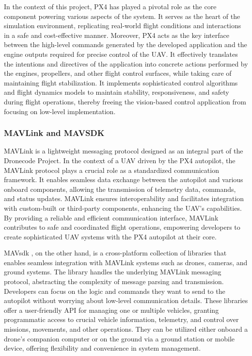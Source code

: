 In the context of this project, PX4 has played a pivotal role as the core component powering various aspects of the system. It serves as the heart of the simulation environment, replicating real-world flight conditions and interactions in a safe and cost-effective manner.
Moreover, PX4 acts as the key interface between the high-level commands generated by the developed application and the engine outputs required for precise control of the UAV. It effectively translates the intentions and directives of the application into concrete actions performed by the engines, propellers, and other flight control surfaces, while taking care of maintaining flight stabilization.
It implements sophisticated control algorithms and flight dynamics models to maintain stability, responsiveness, and safety during flight operations, thereby freeing the vision-based control application from focusing on low-level implementation.


\subsubsection{MAVLink and MAVSDK}
\label{subsec:mavlink}

MAVLink \cite{mavlink-front} is a lightweight messaging protocol designed as an integral part of the Dronecode Project.
In the context of a UAV driven by the PX4 autopilot, the MAVLink protocol plays a crucial role as a standardized communication framework. It enables seamless data exchange between the autopilot and various onboard components, allowing the transmission of telemetry data, commands, and status updates. MAVLink ensures interoperability and facilitates integration with custom-built or third-party components, enhancing the UAV's capabilities. By providing a reliable and efficient communication interface, MAVLink contributes to safe and coordinated flight operations, empowering developers to create sophisticated UAV systems with the PX4 autopilot at their core.

MAV\acrshort{sdk} \cite{mavsdk-front}, on the other hand, is a cross-platform collection of libraries that enables seamless integration with MAVLink systems such as drones, cameras, and ground systems.
The library handles the underlying MAVLink messaging protocol, abstracting the complexity of message parsing and transmission. Developers can focus on the logic and commands they want to send to the autopilot without worrying about low-level communication details.
These libraries offer a user-friendly API for managing one or multiple vehicles, granting programmatic access to crucial vehicle information, telemetry, and control over missions, movements, and other operations. They can be utilized either onboard a drone's companion computer or on the ground via a ground station or mobile device, offering flexibility and convenience in system management.

